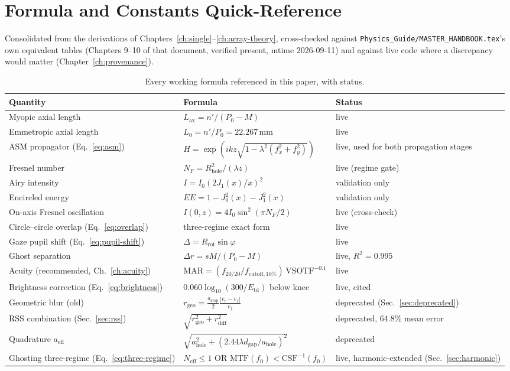 \chapter{Formula and Constants Quick-Reference}
\label{ch:quickref}

Consolidated from the derivations of Chapters~\ref{ch:single}--\ref{ch:array-theory},
cross-checked against \texttt{Physics\_Guide/MASTER\_HANDBOOK.tex}'s own equivalent
tables (Chapters 9--10 of that document, verified present, mtime 2026-09-11) and
against live code where a discrepancy would matter (Chapter~\ref{ch:provenance}).

\begin{longtable}{p{4.6cm}p{5.6cm}p{2.8cm}}
\caption{Every working formula referenced in this paper, with status.}\\
\toprule
Quantity & Formula & Status \\
\midrule
\endhead
Myopic axial length & $L_{\mathrm{ax}}=n'/(P_0-M)$ & live \\
Emmetropic axial length & $L_0=n'/P_0=22.267$\,mm & live \\
ASM propagator (Eq.~\ref{eq:asm}) & $H=\exp(ikz\sqrt{1-\lambda^2(f_x^2+f_y^2)})$ & live,
used for both propagation stages \\
Fresnel number & $N_F=R_{\mathrm{hole}}^2/(\lambda z)$ & live (regime gate) \\
Airy intensity & $I=I_0(2J_1(x)/x)^2$ & validation only \\
Encircled energy & $EE=1-J_0^2(x)-J_1^2(x)$ & validation only \\
On-axis Fresnel oscillation & $I(0,z)=4I_0\sin^2(\pi N_F/2)$ & live (cross-check) \\
Circle--circle overlap (Eq.~\ref{eq:overlap}) & three-regime exact form & live \\
Gaze pupil shift (Eq.~\ref{eq:pupil-shift}) & $\Delta=R_{\mathrm{rot}}\sin\varphi$ & live \\
Ghost separation & $\Delta r=sM/(P_0-M)$ & live, $R^2=0.995$ \\
Acuity (recommended, Ch.~\ref{ch:acuity}) & $\mathrm{MAR}=(f_{20/20}/f_{\mathrm{cutoff,10\%}})\,\mathrm{VSOTF}^{-0.1}$ & live \\
Brightness correction (Eq.~\ref{eq:brightness}) & $0.060\log_{10}(300/E_{\mathrm{td}})$
below knee & live, cited \\
Geometric blur (old) & $r_{\mathrm{geo}}=\frac{a_{\mathrm{stop}}}{2}\frac{|v_r-v_f|}{v_f}$
& deprecated (Sec.~\ref{sec:deprecated}) \\
RSS combination (Sec.~\ref{sec:rss}) & $\sqrt{r_{\mathrm{geo}}^2+r_{\mathrm{diff}}^2}$ &
deprecated, 64.8\% mean error \\
Quadrature $a_{\mathrm{eff}}$ & $\sqrt{a_{\mathrm{hole}}^2+(2.44\lambda d_{\mathrm{gap}}/a_{\mathrm{hole}})^2}$
& deprecated \\
Ghosting three-regime (Eq.~\ref{eq:three-regime}) & $N_{\mathrm{eff}}\le1$ OR
$\mathrm{MTF}(f_0)<\mathrm{CSF}^{-1}(f_0)$ & live, harmonic-extended (Sec.~\ref{sec:harmonic}) \\
\bottomrule
\end{longtable}

